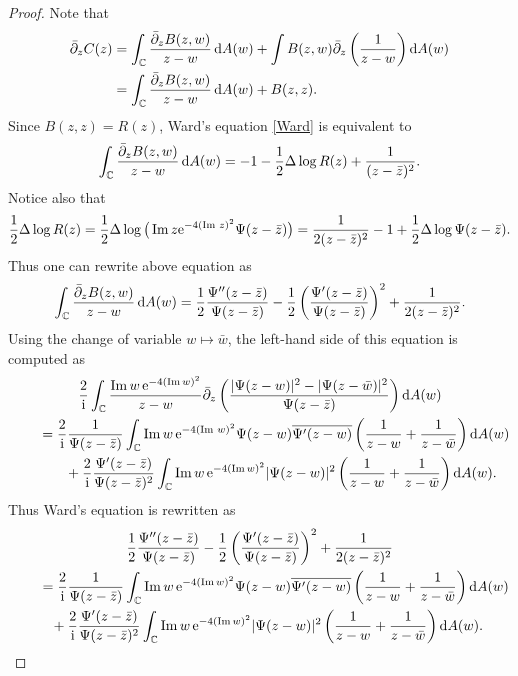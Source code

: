 \documentclass[pdftex]{sigma}
\numberwithin{equation}{section}
\newcommand{\C}{{\mathbb C}}
\newcommand{\im}{\operatorname{Im}}
\newcommand{\1}{\chi}
\def\bp{{\bar\partial}}
\begin{document}
\begin{proof}Note that
\begin{align*}
\bp_z C(z)& =\int_\C \frac{\bp_z B(z,w)}{z-w}\,{\rm d}A(w)+\int B(z,w) \bp_z \left( \frac{1}{z-w} \right) {\rm d}A(w)\\
&=\int_\C \frac{\bp_z B(z,w)}{z-w}\,{\rm d}A(w)+B(z,z).
\end{align*}
Since $B(z,z)=R(z)$, Ward's equation \eqref{Ward} is equivalent to
\begin{gather*}
\int_\C \frac{\bp_z B(z,w)}{z-w}\,{\rm d}A(w)=-1-\dfrac12 \Delta \log R(z)+\dfrac{1}{(z-\bar{z})^2}.
\end{gather*}
	Notice also that
	\begin{gather*}
			\dfrac12 \Delta \log R(z) =\frac12 \Delta \log \big( \im z {\rm e}^{-4 (\im\,z)^2} \Psi(z-\bar{z}) \big)
			=\dfrac{1}{2(z-\bar{z})^2}-1 +\frac12 \Delta \log \Psi(z-\bar{z}).
		\end{gather*}
	Thus one can rewrite above equation as
	\begin{gather*}
			\int_\C \frac{\bp_z B(z,w)}{z-w}\,{\rm d}A(w)
			 =\frac12 \frac{ \Psi''(z-\bar{z}) }{ \Psi(z-\bar{z}) }-\frac12 \left( \frac{\Psi'(z-\bar{z})}{\Psi(z-\bar{z})} \right)^2+\dfrac{1}{2(z-\bar{z})^2}.
		\end{gather*}
	Using the change of variable $w \mapsto \bar{w}$, the left-hand side of this equation is computed as
	\begin{gather*}
 \frac{2}{{\rm i}} \int_\C \frac{ \im w\, {\rm e}^{ -4(\im w)^2 }}{z-w} \bp_z \left( \frac{ |\Psi(z-w)|^2-|\Psi(z-\bar{w})|^2 }{ \Psi(z-\bar{z})} \right) {\rm d}A(w)
			\\
\qquad{}= \frac{2}{{\rm i}} \frac{1}{\Psi(z-\bar{z})}\int_\C \im w\, {\rm e}^{ -4(\im\,w)^2 } \Psi(z-w) \overline{ \Psi'(z-w) } \left( \frac{1}{z-w}+\frac{1}{z-\bar{w}} \right) {\rm d}A(w)
			\\
\qquad\quad{}+ \frac{2}{{\rm i}} \frac{ \Psi'(z-\bar{z}) }{ \Psi(z-\bar{z})^2 } \int_\C \im w\, {\rm e}^{ -4(\im w)^2 } |\Psi(z-w)|^2 \left( \frac{1}{z-w}+\frac{1}{z-\bar{w}} \right) {\rm d}A(w).
		\end{gather*}
	Thus Ward's equation is rewritten as
	\begin{gather*}
\frac12 \frac{ \Psi''(z-\bar{z}) }{ \Psi(z-\bar{z}) }-\frac12 \left( \frac{\Psi'(z-\bar{z})}{\Psi(z-\bar{z})} \right)^2+\dfrac{1}{2(z-\bar{z})^2}
			\\
\qquad{} = \frac{2}{{\rm i}} \frac{1}{\Psi(z-\bar{z})}\int_\C \im w\, {\rm e}^{ -4(\im w)^2 } \Psi(z-w) \overline{ \Psi'(z-w) } \left( \frac{1}{z-w}+\frac{1}{z-\bar{w}} \right) {\rm d}A(w)
			\\
\qquad\quad{} + \frac{2}{{\rm i}} \frac{ \Psi'(z-\bar{z}) }{ \Psi(z-\bar{z})^2 } \int_\C \im w\, {\rm e}^{ -4(\im w)^2 } |\Psi(z-w)|^2 \left( \frac{1}{z-w}+\frac{1}{z-\bar{w}} \right) {\rm d}A(w).\tag*{\qed}
\end{gather*}
\renewcommand{\qed}{}
\end{proof}
\end{document}
